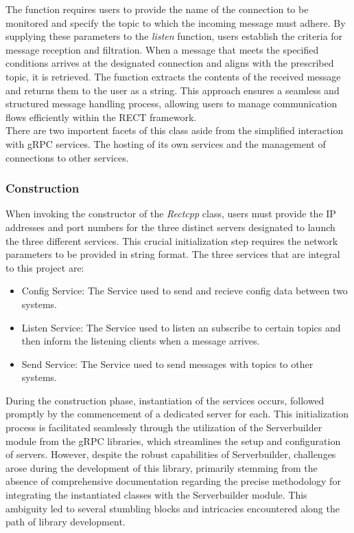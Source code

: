 The function requires users to provide the name of the connection to be monitored and specify the topic to which the incoming message must adhere. By supplying 
these parameters to the \textit{listen} function, users establish the criteria for message reception and filtration. When a message that meets the specified conditions 
arrives at the designated connection and aligns with the prescribed topic, it is retrieved. The function extracts the contents of the received message and 
returns them to the user as a string. This approach ensures a seamless and structured message handling process, allowing users to manage communication flows 
efficiently within the RECT framework.\\

There are two importent facets of this class aside from the simplified interaction with gRPC services. The hosting of its own services and the management of
connections to other services.

\subsubsection{Construction}
When invoking the constructor of the \textit{Rectcpp} class, users must provide the IP addresses and port numbers for the three distinct servers designated to launch the 
three different services. This crucial initialization step requires the network parameters to be provided in string format. The three services that are integral 
to this project are:  

\begin{itemize}
  \item{Config Service:} The Service used to send and recieve config data between two systems.
  \item{Listen Service:} The Service used to listen an subscribe to certain topics and then inform the listening clients when a message arrives.
  \item{Send Service:} The Service used to send messages with topics to other systems.
\end{itemize}

During the construction phase, instantiation of the services occurs, followed promptly by the commencement of a dedicated server for each. This initialization 
process is facilitated seamlessly through the utilization of the Serverbuilder module from the gRPC libraries, which streamlines the setup and configuration of 
servers. However, despite the robust capabilities of Serverbuilder, challenges arose during the development of this library, primarily stemming from the absence 
of comprehensive documentation regarding the precise methodology for integrating the instantiated classes with the Serverbuilder module. This ambiguity led to 
several stumbling blocks and intricacies encountered along the path of library development.

